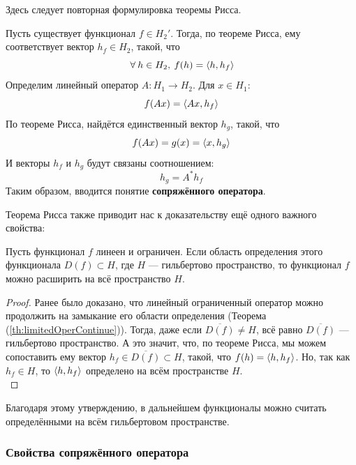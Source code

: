 \documentclass[12pt]{article}
\begin{document}
		{\color{gray}
			Здесь следует повторная формулировка теоремы Рисса.
		}
	
		Пусть существует функционал $f \in H_2'$. Тогда, по теореме Рисса, ему соответствует вектор $h_f \in H_2$, такой, что 
		$$\forall h \in H_2, \: f(h) = \scal{h}{h_f}$$
		Определим линейный оператор $A : H_1 \rightarrow H_2$. Для $x \in H_1$: 
		$$f(Ax) = \left\langle Ax, h_f \right\rangle$$
		По теореме Рисса, найдётся единственный вектор $h_g$, такой, что 
		$$f(Ax) = g(x) = \left\langle x, h_g \right\rangle$$
		И векторы $h_f$ и $h_g$ будут связаны соотношением:
		$$h_g = A^{*}h_f$$
		Таким образом, вводится понятие \textbf{сопряжённого оператора}.

		Теорема Рисса также приводит нас к доказательству ещё одного важного свойства:
		\begin{state}
			Пусть функционал $f$ линеен и ограничен. Если область определения этого функционала $D(f) \subset H$, 
			где $H$ --- гильбертово пространство, то функционал $f$ можно расширить на всё пространство $H$.
		\end{state}
		\begin{proof}
			Ранее было доказано, что линейный ограниченный оператор можно продолжить на замыкание его области определения 
			(Теорема (\ref{th:limitedOperContinue})). Тогда, даже если $\overline{D(f)} \neq H$, всё равно $\overline{D(f)}$ --- гильбертово 
			пространство.
			А это значит, что, по теореме Рисса, мы можем сопоставить ему вектор $h_f \in \overline{D(f)} \subset H$, такой, что 
			$f(h) = \left\langle h, h_f \right\rangle$. Но, так как $h_f \in H$, то $\left\langle h, h_f \right\rangle$ определено на всём пространстве $H$. \\
		\end{proof}
	
		Благодаря этому утверждению, в дальнейшем функционалы можно считать определёнными на всём гильбертовом пространстве.
	
		\subsubsection{Свойства сопряжённого оператора}
	
\end{document}
